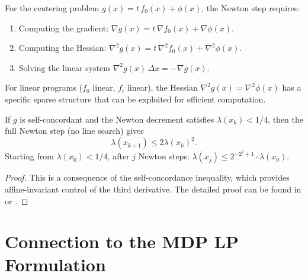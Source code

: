 \documentclass[11pt,a4paper]{article}
\begin{document}
\begin{remark}\label{rem:newton-barrier}
For the centering problem $g(x) = t\,f_0(x) + \phi(x)$, the Newton
step requires:
\begin{enumerate}
  \item Computing the gradient: $\nabla g(x) = t\,\nabla f_0(x)
    + \nabla\phi(x)$.
  \item Computing the Hessian: $\nabla^2 g(x) = t\,\nabla^2 f_0(x)
    + \nabla^2\phi(x)$.
  \item Solving the linear system
    $\nabla^2 g(x)\,\Delta x = -\nabla g(x)$.
\end{enumerate}
For linear programs ($f_0$ linear, $f_i$ linear), the Hessian
$\nabla^2 g(x) = \nabla^2\phi(x)$ has a specific sparse structure
that can be exploited for efficient computation.
\end{remark}

\begin{proposition}%
\label{prop:newton-quadratic}
If $g$ is self-concordant and the Newton decrement satisfies
$\lambda(x_k) < 1/4$, then the full Newton step (no line search) gives
\begin{equation}\label{eq:quadratic-conv}
  \lambda(x_{k+1}) \le 2\lambda(x_k)^2.
\end{equation}
Starting from $\lambda(x_0) < 1/4$, after $j$ Newton steps:
$\lambda(x_j) \le 2^{-2^j+1} \cdot \lambda(x_0)$.
\end{proposition}

\begin{proof}
This is a consequence of the self-concordance inequality, which
provides affine-invariant control of the third derivative. The
detailed proof can be found in \citet[Theorem~4.1.14]{nesterov2004}
or \citet[Chapter~4]{wright1997}.
\end{proof}


\section{Connection to the MDP LP Formulation}\label{sec:mdp}
\end{document}
